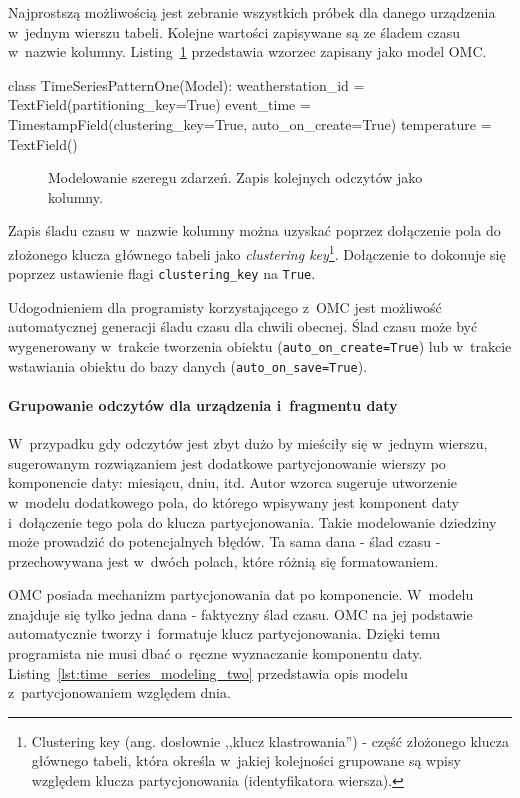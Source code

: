 Najprostszą możliwością jest zebranie wszystkich próbek dla danego urządzenia w~jednym wierszu tabeli. Kolejne wartości zapisywane są ze śladem czasu w~nazwie kolumny. Listing~\ref{lst:time_series_modeling_one} przedstawia wzorzec zapisany jako model OMC.

\begin{verbbox}[\footnotesize]
class TimeSeriesPatternOne(Model):
    weatherstation_id = TextField(partitioning_key=True)
    event_time = TimestampField(clustering_key=True, auto_on_create=True)
    temperature = TextField()
\end{verbbox}

\begin{figure}[ht!]
	\centering
	\theverbbox
	\caption{Modelowanie szeregu zdarzeń. Zapis kolejnych odczytów jako kolumny.}
	\label{lst:time_series_modeling_one}
\end{figure}

Zapis śladu czasu w~nazwie kolumny można uzyskać poprzez dołączenie pola do złożonego klucza głównego tabeli jako \emph{clustering key}\footnote{Clustering key (ang. dosłownie ,,klucz klastrowania'') - część złożonego klucza głównego tabeli, która określa w~jakiej kolejności grupowane są wpisy względem klucza partycjonowania (identyfikatora wiersza).}. Dołączenie to dokonuje się poprzez ustawienie flagi \verb+clustering_key+ na \verb+True+. 

Udogodnieniem dla programisty korzystającego z~OMC jest możliwość automatycznej generacji śladu czasu dla chwili obecnej. Ślad czasu może być wygenerowany w~trakcie tworzenia obiektu (\verb+auto_on_create=True+) lub w~trakcie wstawiania obiektu do bazy danych (\verb+auto_on_save=True+).  

\paragraph{Grupowanie odczytów dla urządzenia i~fragmentu daty} 

W~przypadku gdy odczytów jest zbyt dużo by mieściły się w~jednym wierszu, sugerowanym rozwiązaniem jest dodatkowe partycjonowanie wierszy po komponencie daty: miesiącu, dniu, itd. Autor wzorca sugeruje utworzenie w~modelu dodatkowego pola, do którego wpisywany jest komponent daty i~dołączenie tego pola do klucza partycjonowania. Takie modelowanie dziedziny może prowadzić do potencjalnych błędów. Ta sama dana - ślad czasu - przechowywana jest w~dwóch polach, które różnią się formatowaniem. 

OMC posiada mechanizm partycjonowania dat po komponencie. W~modelu znajduje się tylko jedna dana - faktyczny ślad czasu. OMC na jej podstawie automatycznie tworzy i~formatuje klucz partycjonowania. Dzięki temu programista nie musi dbać o~ręczne wyznaczanie komponentu daty. Listing~\ref{lst:time_series_modeling_two} przedstawia opis modelu z~partycjonowaniem względem dnia.


